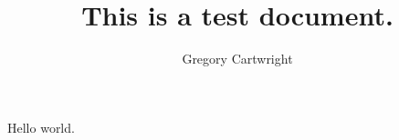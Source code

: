 \documentclass[12pt]{article}
\begin{document}
\author{Gregory Cartwright}
\title{This is a test document.}
\maketitle
Hello world.
\end{document}
